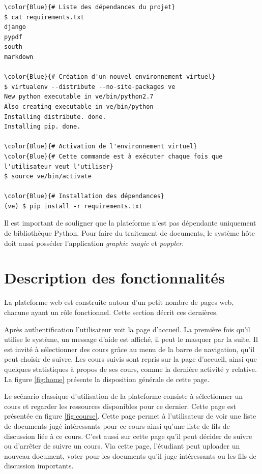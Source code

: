 \documentclass[a4paper,12pt]{article}
\begin{document}
\begin{Verbatim}
\color{Blue}{# Liste des dépendances du projet}
$ cat requirements.txt
django
pypdf
south
markdown

\color{Blue}{# Création d'un nouvel environnement virtuel}
$ virtualenv --distribute --no-site-packages ve
New python executable in ve/bin/python2.7
Also creating executable in ve/bin/python
Installing distribute. done.
Installing pip. done.

\color{Blue}{# Activation de l'environnement virtuel}
\color{Blue}{# Cette commande est à exécuter chaque fois que l'utilisateur veut l'utiliser}
$ source ve/bin/activate

\color{Blue}{# Installation des dépendances}
(ve) $ pip install -r requirements.txt
\end{Verbatim}

Il est important de souligner que la plateforme n'est pas dépendante uniquement de
bibliothèque Python. Pour faire du traitement de documents, le système hôte doit aussi
posséder l'application \textit{graphic magic} et \textit{poppler}.


\section{Description des fonctionnalités}

La plateforme web est construite autour d'un petit nombre de pages web, chacune
ayant un rôle fonctionnel. Cette section décrit ces dernières.

Après authentification l'utilisateur voit la page d'accueil. La première fois qu'il
utilise le système, un message d'aide est affiché, il peut le masquer par la suite.
Il est invité à sélectionner des cours grâce au menu de la barre de navigation,
qu'il peut choisir de suivre. Les cours suivis sont repris sur la page d'accueil, ainsi
que quelques statistiques à propos de ses cours, comme la dernière activité y relative.
La figure \ref{fig:home} présente la disposition générale de cette page.

Le scénario classique d'utilisation de la plateforme consiste à sélectionner un cours
et regarder les ressources disponibles pour ce dernier. Cette page est présentée en
figure \ref{fig:course}. Cette page permet à l'utilisateur de voir une liste de documents
jugé intéressants pour ce cours ainsi qu'une liste de fils de discussion liée à ce cours.
C'est aussi sur cette page qu'il peut décider de suivre ou d'arrêter de suivre un cours.
Via cette page, l'étudiant peut uploader un nouveau document, voter pour les documents
qu'il juge intéressants ou les fils de discussion importants.
\end{document}
